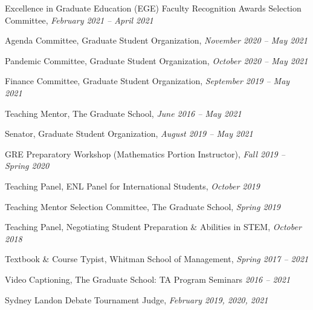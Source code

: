 \begin{enumDiamond}[itemsep=0.1cm]
\item Excellence in Graduate Education (EGE) Faculty Recognition Awards Selection Committee, {\itshape February 2021 -- April 2021} 
\item Agenda Committee, Graduate Student Organization, {\itshape November 2020 -- May 2021}
\item Pandemic Committee, Graduate Student Organization, {\itshape October 2020 -- May 2021}
\item Finance Committee, Graduate Student Organization, {\itshape September 2019 -- May 2021}
\item Teaching Mentor, The Graduate School, {\itshape June 2016 -- May 2021}
\item Senator, Graduate Student Organization, {\itshape August 2019 -- May 2021}
\item GRE Preparatory Workshop (Mathematics Portion Instructor), {\itshape Fall 2019 -- Spring 2020}
\item Teaching Panel, ENL Panel for International Students, {\itshape October 2019}
\item Teaching Mentor Selection Committee, The Graduate School, {\itshape Spring 2019}
\item Teaching Panel, Negotiating Student Preparation \& Abilities in STEM, {\itshape October 2018}
\item Textbook \& Course Typist, Whitman School of Management, {\itshape Spring 2017 -- 2021}
\item Video Captioning, The Graduate School: TA Program Seminars {\itshape 2016 -- 2021}
\end{enumDiamond} \twomedskip\twomedskip
 
\begin{enumDiamond}[itemsep=0.1cm]
\item Sydney Landon Debate Tournament Judge, {\itshape February 2019, 2020, 2021}
\end{enumDiamond} \twomedskip \twomedskip
 
 
 


\newpage







